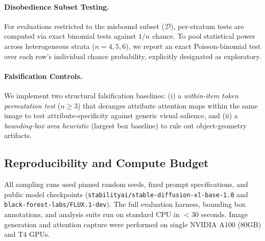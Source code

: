 \paragraph{Disobedience Subset Testing.} For evaluations restricted to the misbound subset ($\mathcal{D}$), per-stratum tests are computed via exact binomial tests against $1/n$ chance. To pool statistical power across heterogeneous strata ($n=4, 5, 6$), we report an exact Poisson-binomial test over each row's individual chance probability, explicitly designated as exploratory.

\paragraph{Falsification Controls.} We implement two structural falsification baselines: (i) a \emph{within-item token permutation test} ($n \ge 3$) that deranges attribute attention maps within the same image to test attribute-specificity against generic visual salience, and (ii) a \emph{bounding-box area heuristic} (largest box baseline) to rule out object-geometry artifacts.

\subsection{Reproducibility and Compute Budget}
\label{sec:setup_reproducibility}
All sampling runs used pinned random seeds, fixed prompt specifications, and public model checkpoints (\texttt{stabilityai/stable-diffusion-xl-base-1.0} and \texttt{black-forest-labs/FLUX.1-dev}). The full evaluation harness, bounding box annotations, and analysis suite run on standard CPU in $<30$ seconds. Image generation and attention capture were performed on single NVIDIA A100 (80GB) and T4 GPUs.
